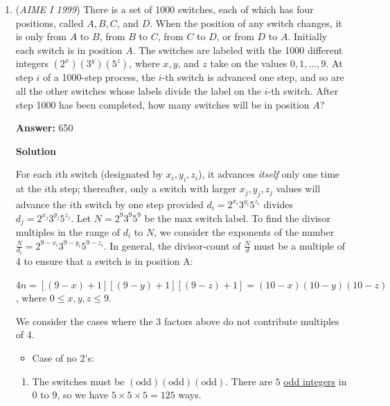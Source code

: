 \begin{enumerate}
 


	\item (\textit{AIME I 1999}) There is a set of 1000 switches, each of which has four positions, called $A, B, C$, and $D$.  When the position of any switch changes, it is only from $A$ to $B$, from $B$ to $C$, from $C$ to $D$, or from $D$ to $A$.  Initially each switch is in position $A$.  The switches are labeled with the 1000 different integers $(2^{x})(3^{y})(5^{z})$, where $x, y$, and $z$ take on the values $0, 1, \ldots, 9$.  At step $i$ of a 1000-step process, the $i$-th switch is advanced one step, and so are all the other switches whose labels divide the label on the $i$-th switch.  After step 1000 has been completed, how many switches will be in position $A$?


 
 \textbf{Answer: }650



\textbf{Solution}

For each $i$th switch (designated by $x_{i},y_{i},z_{i}$), it advances \textit{itself} only one time at the $i$th step; thereafter, only a switch with larger $x_{j},y_{j},z_{j}$ values will advance the $i$th switch by one step provided $d_{i}= 2^{x_{i}}3^{y_{i}}5^{z_{i}}$ divides $d_{j}= 2^{x_{j}}3^{y_{j}}5^{z_{j}}$. Let $N = 2^{9}3^{9}5^{9}$ be the max switch label. To find the divisor multiples in the range of $d_{i}$ to $N$, we consider the exponents of the number $\frac{N}{d_{i}}= 2^{9-x_{i}}3^{9-y_{i}}5^{9-z_{i}}$. In general, the divisor-count of $\frac{N}{d}$ must be a multiple of 4 to ensure that a switch is in position A:

 $4n = [(9-x)+1] [(9-y)+1] [(9-z)+1] = (10-x)(10-y)(10-z)$, where $0 \le x,y,z \le 9.$

 We consider the cases where the 3 factors above do not contribute multiples of 4.

 
            \begin{itemize}
        \item Case of no 2's:
            \end{itemize}
            
            \begin{enumerate}[label=(\roman*)]
                \item The switches must be $(\mathrm{odd})(\mathrm{odd})(\mathrm{odd})$. There are $5$ \href{https://artofproblemsolving.com/wiki/index.php?title=Odd\_integer}{odd integers} in $0$ to $9$, so we have $5 \times 5 \times 5 = 125$ ways.
            \end{enumerate}
            

\end{enumerate}
